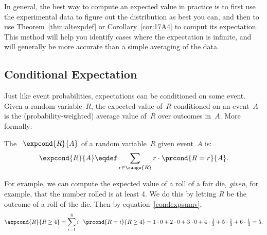 In general, the best way to compute an expected value in practice is
to first use the experimental data to figure out the distribution as
best you can, and then to use Theorem~\ref{thm:altexpdef} or
Corollary~\ref{cor:17A4} to comput its expectation.  This method will
help you identify cases where the expectation is infinite, and will
generally be more accurate than a simple averaging of the data.

\subsection{Conditional Expectation}

Just like event probabilities, expectations can be conditioned on some
event.  Given a random variable~$R$, the expected value of~$R$
conditioned on an event~$A$ is the (probability-weighted) average
value of~$R$ over outcomes in~$A$.  More formally:
\begin{definition}\label{condexpdef}
The ~$\expcond{R}{A}$ of a random
variable~$R$ given event~$A$ is:
\begin{equation}\label{condexpsumv}
\expcond{R}{A} \eqdef \sum_{r \in \range{R}} r \cdot\prcond{R=r}{A}.
\end{equation}
\end{definition}

For example, we can compute the expected value of a roll of a fair die,
\emph{given}, for example, that the number rolled is at least 4.  We do
this by letting $R$ be the outcome of a roll of the die.  Then
by equation~\eqref{condexpsumv},
\[
\expcond{R}{R \geq 4} = \sum_{i=1}^6 i \cdot \prcond{R=i}{R \ge 4}
= 1\cdot 0 + 2\cdot 0 + 3\cdot 0 +
  4\cdot\tfrac{1}{3} + 5\cdot\tfrac{1}{3} + 6\cdot\tfrac{1}{3}
= 5.
\]

